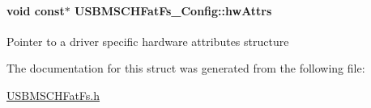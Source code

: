 \paragraph[{hw\+Attrs}]{\setlength{\rightskip}{0pt plus 5cm}void const$\ast$ U\+S\+B\+M\+S\+C\+H\+Fat\+Fs\+\_\+\+Config\+::hw\+Attrs}\label{struct_u_s_b_m_s_c_h_fat_fs___config_ab91b03539dc769508dd811ab7b0c1e82}
Pointer to a driver specific hardware attributes structure 

The documentation for this struct was generated from the following file\+:\begin{DoxyCompactItemize}
\item 
\hyperlink{_u_s_b_m_s_c_h_fat_fs_8h}{U\+S\+B\+M\+S\+C\+H\+Fat\+Fs.\+h}\end{DoxyCompactItemize}
